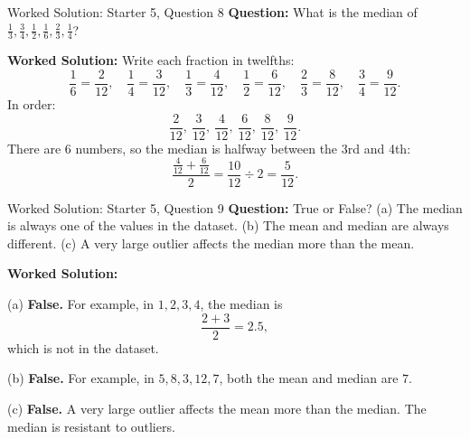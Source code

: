 \documentclass{beamer}
\begin{document}
\begin{frame}{Worked Solution: Starter 5, Question 8}
\textbf{Question:} What is the median of \(\frac{1}{3}, \frac{3}{4}, \frac{1}{2}, \frac{1}{6}, \frac{2}{3}, \frac{1}{4}\)?

\textbf{Worked Solution:}
Write each fraction in twelfths:
\[
\frac{1}{6}=\frac{2}{12},\quad
\frac{1}{4}=\frac{3}{12},\quad
\frac{1}{3}=\frac{4}{12},\quad
\frac{1}{2}=\frac{6}{12},\quad
\frac{2}{3}=\frac{8}{12},\quad
\frac{3}{4}=\frac{9}{12}.
\]
In order:
\[
\frac{2}{12},\ \frac{3}{12},\ \frac{4}{12},\ \frac{6}{12},\ \frac{8}{12},\ \frac{9}{12}.
\]
There are 6 numbers, so the median is halfway between the 3rd and 4th:
\[
\frac{\frac{4}{12} + \frac{6}{12}}{2}
= \frac{10}{12} \div 2
= \frac{5}{12}.
\]
\end{frame}

\begin{frame}{Worked Solution: Starter 5, Question 9}
\textbf{Question:} True or False?
(a) The median is always one of the values in the dataset.
(b) The mean and median are always different.
(c) A very large outlier affects the median more than the mean.

\textbf{Worked Solution:}

(a) \textbf{False.}
For example, in \(1, 2, 3, 4\), the median is
\[
\frac{2 + 3}{2} = 2.5,
\]
which is not in the dataset.

(b) \textbf{False.}
For example, in \(5, 8, 3, 12, 7\), both the mean and median are \(7\).

(c) \textbf{False.}
A very large outlier affects the mean more than the median. The median is resistant to outliers.
\end{frame}
\end{document}
